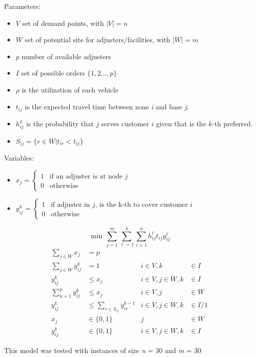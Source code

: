 \begin{frame}
  Parameters:
  \begin{itemize}
  \item $V$ set of demand points, with $|V| = n$
  \item $W$ set of potential site for adjusters/facilities, with $|W| = m$
  \item $p$ number of available adjusters
  \item $I$  set of possible orders $\{1,2\ldots,p\}$
  \item $\rho$ is the utilization of each vehicle
  \item $t_{ij}$ is the expected travel time between zone \textit{i} and base \textit{j}.
  \item $h_{ij}^{k}$ is the probability that $j$ serves customer $i$ given that
    is the $k$-th preferred.
  \item $S_{ij} = \{r\in W | t_{ir} < t_{ij}\}$
  \end{itemize}
  
  Variables:
  \begin{itemize}
  \item $x_j =
    \begin{cases} 
      1 & \mbox{if an adjuster is at node } j \\
      0 & \mbox{otherwise}
    \end{cases}$
  \item $y_{ij}^k =
    \begin{cases} 
      1 & \mbox{if adjuster in } j \mbox{, is the k-th to cover customer }i \\
      0 & \mbox{otherwise}
  \end{cases}$
  \end{itemize}
\end{frame}

\begin{frame}[allowframebreaks]{}{}

{\small
  \begin{equation}
    \min \, \sum_{j=1}^{m}{\sum_{\ell=1}^{k}{\sum_{i=1}^{n}{h_{ij}^{\ell}t_{ij}y_{ij}^{\ell}}}}
  \end{equation}
}
{\small
  \begin{align}
    \sum_{j \in W}{x_j} & = p               &                                  &\\
    \sum_{j \in W}{y_{ij}^{k}} & = 1        &          i \in V, k &\in I \\
    y_{ij}^{k} & \leq x_j                   &  i \in V,j \in W, k &\in I \\
    \sum_{k = 1}^{p}{y_{ij}^{k}} & \leq x_j &          i \in V, j &\in W \\
    y_{ij}^{k} &\leq \sum_{r\in S_{ij}}{y_{ir}^{k-1}} &  i \in V,j \in W, k &\in I/{1} \\
    x_{j} & \in \{0,1\}      &                  j &\in W \nonumber\\
    y_{ij}^{k} & \in \{0,1\} &  i \in V,j \in W,k &\in I \nonumber
  \end{align}
}
\end{frame}

\begin{frame}
  This model was tested with instances of size \textit{n} = 30 and \textit{m} = 30
\end{frame}
